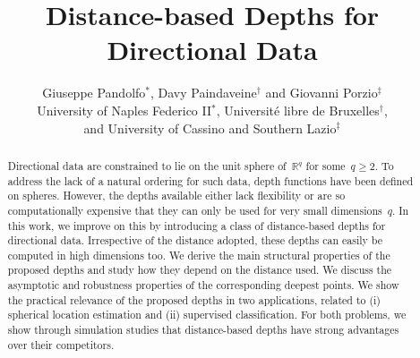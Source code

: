 \documentclass[usenames,dvipsnames]{article}
\begin{document}
\renewcommand{\eqref}[1]{(\ref{#1})}
\newcommand{\mb}[1]{\mathbf{#1}}
\newcommand{\mbb}[1]{\mathbb{#1}}
\newcommand{\R}{\mathbb{R}}
\newcommand{\mt}[1]{\mathrm{#1}}
\newcommand{\rv}{random variable}
\newcommand{\cqfd}{\hfill $\square$}



\title{Distance-based Depths for Directional Data}
\author{\large Giuseppe Pandolfo$^*$, Davy Paindaveine$^\dagger$ and Giovanni Porzio$^\ddagger$\\[3mm]
{\normalsize University of Naples Federico II$^*$,
 Universit\'{e} libre de Bruxelles$^\dagger$}, \\
{\normalsize and University of Cassino and Southern Lazio$^\ddagger$}
}
\date{}

\maketitle






\begin{abstract}
Directional data are constrained to lie on the unit sphere of~$\R^q$ for some~$q\geq 2$. To address the lack of a natural ordering for such data, depth functions have been defined on spheres. However, the depths available either lack flexibility or are so computationally expensive that they can only be used for very small dimensions~$q$. In this work, we improve on this by introducing a class of distance-based depths for directional data. Irrespective of the distance adopted, these depths can easily be computed in high dimensions too. We derive the main structural properties of the proposed depths and study how they depend on the distance used. We discuss the asymptotic and robustness properties of the corresponding deepest points. We show the practical relevance of the proposed depths in two applications, related to (i) spherical location estimation and (ii) supervised classification. For both problems, we show through simulation studies that distance-based depths have strong advantages over their competitors.
\end{abstract}
\end{document}
